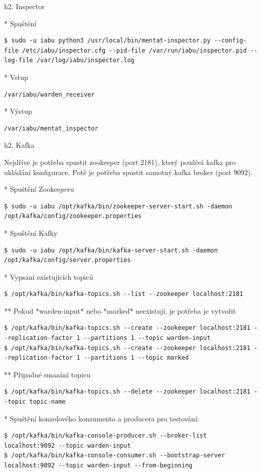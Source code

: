 \documentclass[a4paper]{article} %
\begin{document}
h2. Inspector

* Spuštění
\begin{lstlisting}[]
$ sudo -u iabu python3 /usr/local/bin/mentat-inspector.py --config-file /etc/iabu/inspector.cfg --pid-file /var/run/iabu/inspector.pid --log-file /var/log/iabu/inspector.log
\end{lstlisting}

* Vstup
\begin{lstlisting}[]/var/iabu/warden_receiver
\end{lstlisting}
* Výstup
\begin{lstlisting}[]
/var/iabu/mentat_inspector
\end{lstlisting}

h2. Kafka

Nejdříve je potřeba spustit zookeeper (port 2181), který používá kafka pro ukládání konfigurace. Poté je potřeba spustit samotný kafka broker (port 9092).

* Spuštění Zookeeperu
\begin{lstlisting}[]
$ sudo -u iabu /opt/kafka/bin/zookeeper-server-start.sh -daemon /opt/kafka/config/zookeeper.properties
\end{lstlisting}

* Spuštění Kafky
\begin{lstlisting}[]
$ sudo -u iabu /opt/kafka/bin/kafka-server-start.sh -daemon /opt/kafka/config/server.properties
\end{lstlisting}

* Vypsání existujících topiců
\begin{lstlisting}[]
$ /opt/kafka/bin/kafka-topics.sh --list --zookeeper localhost:2181
\end{lstlisting}
** Pokud *warden-input* nebo *marked* neexistují, je potřeba je vytvořit
\begin{lstlisting}[]
$ /opt/kafka/bin/kafka-topics.sh --create --zookeeper localhost:2181 --replication-factor 1 --partitions 1 --topic warden-input
$ /opt/kafka/bin/kafka-topics.sh --create --zookeeper localhost:2181 --replication-factor 1 --partitions 1 --topic marked
\end{lstlisting}
** Připadné smazání topicu
\begin{lstlisting}[]
$ /opt/kafka/bin/kafka-topics.sh --delete --zookeeper localhost:2181 --topic topic-name
\end{lstlisting}

* Spuštění konzolového konzumenta a producera pro testování:
\begin{lstlisting}[]
$ /opt/kafka/bin/kafka-console-producer.sh --broker-list localhost:9092 --topic warden-input
$ /opt/kafka/bin/kafka-console-consumer.sh --bootstrap-server localhost:9092 --topic warden-input --from-beginning
\end{lstlisting}
\end{document}

